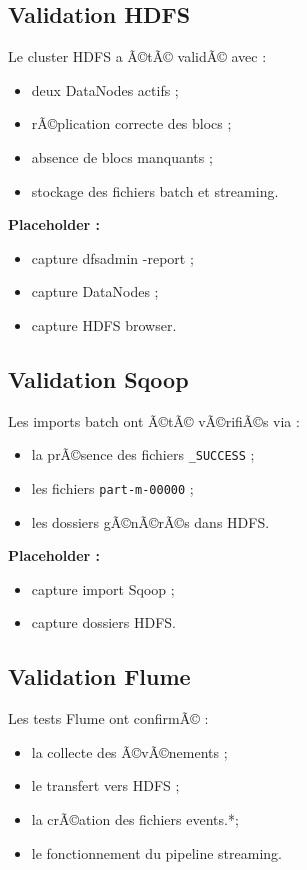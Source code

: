 ﻿\documentclass[12pt,a4paper]{report}
\begin{document}
\subsection{Validation HDFS}

Le cluster HDFS a Ã©tÃ© validÃ© avec :
\begin{itemize}
    \item deux DataNodes actifs ;
    \item rÃ©plication correcte des blocs ;
    \item absence de blocs manquants ;
    \item stockage des fichiers batch et streaming.
\end{itemize}

\vspace{0.3cm}

\textbf{Placeholder :}
\begin{itemize}
    \item capture dfsadmin -report ;
    \item capture DataNodes ;
    \item capture HDFS browser.
\end{itemize}

\subsection{Validation Sqoop}

Les imports batch ont Ã©tÃ© vÃ©rifiÃ©s via :
\begin{itemize}
    \item la prÃ©sence des fichiers \texttt{\_SUCCESS} ;
    \item les fichiers \texttt{part-m-00000} ;
    \item les dossiers gÃ©nÃ©rÃ©s dans HDFS.
\end{itemize}

\vspace{0.3cm}

\textbf{Placeholder :}
\begin{itemize}
    \item capture import Sqoop ;
    \item capture dossiers HDFS.
\end{itemize}

\subsection{Validation Flume}

Les tests Flume ont confirmÃ© :
\begin{itemize}
    \item la collecte des Ã©vÃ©nements ;
    \item le transfert vers HDFS ;
    \item la crÃ©ation des fichiers events.*;
    \item le fonctionnement du pipeline streaming.
\end{itemize}
\end{document}
